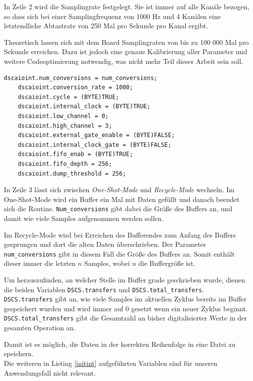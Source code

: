 \documentclass[12pt,a4paper]{scrartcl}
\begin{document}
In Zeile 2 wird die Samplingrate festgelegt. Sie ist immer auf alle Kanäle bezogen, so dass sich bei einer Samplingfrequenz von 1000 Hz und 4 Kanälen eine letztendliche Abtastrate von 250 Mal pro Sekunde pro Kanal ergibt. 

Theoretisch lassen sich mit dem Board Samplingraten von bis zu 100 000 Mal pro Sekunde erreichen. Dazu ist jedoch eine genaue Kalibrierung aller Parameter und weitere Codeoptimierung notwendig, was nicht mehr Teil dieser Arbeit sein soll. \\


\begin{lstlisting}[frame=trBL]
	dscaioint.num_conversions = num_conversions;
	dscaioint.conversion_rate = 1000;
	dscaioint.cycle = (BYTE)TRUE;
	dscaioint.internal_clock = (BYTE)TRUE;
	dscaioint.low_channel = 0;
	dscaioint.high_channel = 3;
	dscaioint.external_gate_enable = (BYTE)FALSE;
	dscaioint.internal_clock_gate = (BYTE)FALSE;
	dscaioint.fifo_enab = (BYTE)TRUE;
	dscaioint.fifo_depth = 256;
	dscaioint.dump_threshold = 256;
\end{lstlisting}

In Zeile 3 lässt sich zwischen \textit{One-Shot-Mode} und \textit{Recycle-Mode} wechseln. Im One-Shot-Mode wird ein Buffer ein Mal mit Daten gefüllt und danach beendet sich die Routine. \texttt{Num\_conversions} gibt dabei die Größe des Buffers an, und damit wie viele Samples aufgenommen werden sollen.

Im Recycle-Mode wird bei Erreichen des Bufferendes zum Anfang des Buffers gesprungen und dort die alten Daten überschrieben. Der Parameter \texttt{num\_conversions} gibt in diesem Fall die Größe des Buffers an. Somit enthält dieser immer die letzten $n$ Samples, wobei $n$ die Buffergröße ist.

Um herauszufinden, an welcher Stelle im Buffer grade geschrieben wurde, dienen die beiden Variablen \texttt{DSCS.transfers} und \texttt{DSCS.total\_transfers}. \texttt{DSCS.transfers} gibt an, wie viele Samples im aktuellen Zyklus bereits im Buffer gespeichert wurden und wird immer auf 0 gesetzt wenn ein neuer Zyklus beginnt. \texttt{DSCS.total\_transfers} gibt die Gesamtzahl an bisher digitalisierter Werte in der gesamten Operation an.

Damit ist es möglich, die Daten in der korrekten Reihenfolge in eine Datei zu speichern.\\

Die weiteren in Listing \ref{initint} aufgeführten Variablen sind für unseren Anwendungsfall nicht relevant.\\
\end{document}
